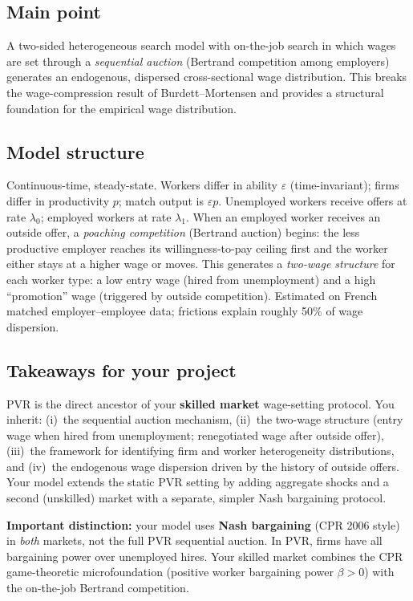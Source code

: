 \documentclass[12pt]{article}
\begin{document}
\subsection*{Main point}

A two-sided heterogeneous search model with on-the-job search in which wages are set through a \emph{sequential auction} (Bertrand competition among employers) generates an endogenous, dispersed cross-sectional wage distribution. This breaks the wage-compression result of Burdett--Mortensen and provides a structural foundation for the empirical wage distribution.

\subsection*{Model structure}

Continuous-time, steady-state. Workers differ in ability $\varepsilon$ (time-invariant); firms differ in productivity $p$; match output is $\varepsilon p$. Unemployed workers receive offers at rate $\lambda_0$; employed workers at rate $\lambda_1$. When an employed worker receives an outside offer, a \emph{poaching competition} (Bertrand auction) begins: the less productive employer reaches its willingness-to-pay ceiling first and the worker either stays at a higher wage or moves. This generates a \emph{two-wage structure} for each worker type: a low entry wage (hired from unemployment) and a high ``promotion'' wage (triggered by outside competition). Estimated on French matched employer--employee data; frictions explain roughly 50\% of wage dispersion.

\subsection*{Takeaways for your project}

PVR is the direct ancestor of your \textbf{skilled market} wage-setting protocol. You inherit: (i)~the sequential auction mechanism, (ii)~the two-wage structure (entry wage when hired from unemployment; renegotiated wage after outside offer), (iii)~the framework for identifying firm and worker heterogeneity distributions, and (iv)~the endogenous wage dispersion driven by the history of outside offers. Your model extends the static PVR setting by adding aggregate shocks and a second (unskilled) market with a separate, simpler Nash bargaining protocol.

\medskip

\noindent\textbf{Important distinction:} your model uses \textbf{Nash bargaining} (CPR 2006 style) in \emph{both} markets, not the full PVR sequential auction. In PVR, firms have all bargaining power over unemployed hires. Your skilled market combines the CPR game-theoretic microfoundation (positive worker bargaining power $\beta > 0$) with the on-the-job Bertrand competition.
\end{document}
